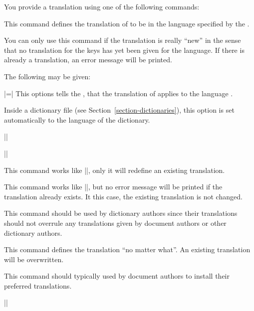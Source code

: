 You provide a translation using one of the following commands:
\begin{command}{\newtranslation{}}
  This command defines the translation of  to be  in the language specified by the .

  You can only use this command if the translation is really ``new'' in the sense that no translation for the keys has yet been given for the language. If there is already a translation, an error message will be printed.

  The following  may be given:
  \begin{itemize}
    |=| This options tells the \translatorname, that the translation  of  applies to the language .

    Inside a dictionary file (see Section~\ref{section-dictionaries}), this option is set automatically to the language of the dictionary.
  \end{itemize}

  \example
  ||

  \example
  ||
\end{command}

\begin{command}{\renewtranslation{}}
  This command works like |\newtranslation|, only it will redefine an existing translation.
\end{command}

\begin{command}{\providetranslation{}}
  This command works like |\newtranslation|, but no error message will be printed if the translation already exists. It this case, the existing translation is not changed.

  This command should be used by dictionary authors since their translations should not overrule any translations given by document authors or other dictionary authors.
\end{command}

\begin{command}{}
  This command defines the translation ``no matter what''. An existing translation will be overwritten.

  This command should typically used by document authors to install their preferred translations.

  \example
  ||
\end{command}

